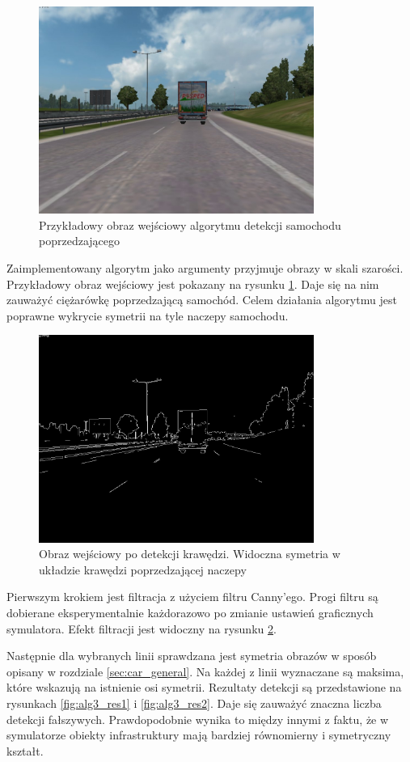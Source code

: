 \begin{figure}
  \centering
  \includegraphics[width=9cm]{img/alg3_input.jpg}
  \caption{Przykładowy obraz wejściowy algorytmu detekcji samochodu poprzedzającego}
  \label{fig:alg3_input}
\end{figure}

Zaimplementowany algorytm jako argumenty przyjmuje obrazy w skali szarości. 
Przykładowy obraz wejściowy jest pokazany na rysunku \ref{fig:alg3_input}. 
Daje się na nim zauważyć ciężarówkę poprzedzającą samochód. 
Celem działania algorytmu jest poprawne wykrycie symetrii na tyle naczepy samochodu.

\begin{figure}
  \centering
  \includegraphics[width=9cm]{img/alg3_canny.jpg}
  \caption{Obraz wejściowy po detekcji krawędzi. Widoczna symetria w układzie krawędzi poprzedzającej naczepy}
  \label{fig:alg3_canny}
\end{figure}

Pierwszym krokiem jest filtracja z użyciem filtru Canny'ego. 
Progi filtru są dobierane eksperymentalnie każdorazowo po zmianie ustawień graficznych symulatora. 
Efekt filtracji jest widoczny na rysunku \ref{fig:alg3_canny}.

Następnie dla wybranych linii  sprawdzana jest symetria obrazów w sposób opisany w rozdziale \ref{sec:car_general}.
Na każdej z linii wyznaczane są maksima, które wskazują na istnienie osi symetrii. 
Rezultaty detekcji są przedstawione na rysunkach \ref{fig:alg3_res1} i \ref{fig:alg3_res2}. 
Daje się zauważyć znaczna liczba detekcji fałszywych. 
Prawdopodobnie wynika to między innymi z faktu, że w symulatorze obiekty infrastruktury mają bardziej równomierny i symetryczny kształt.


